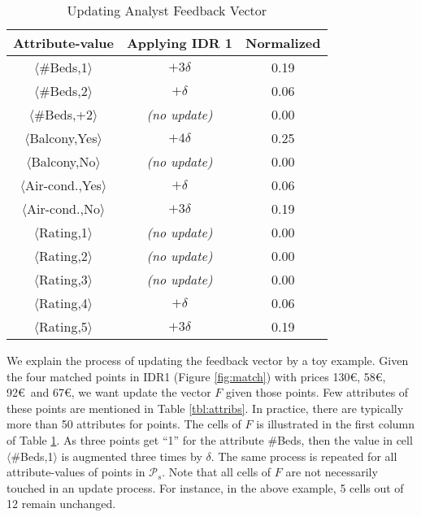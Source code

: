 \begin{table}[]
\centering
\caption{Updating Analyst Feedback Vector}
\label{tbl:feedback}
\begin{tabular}{|c|c|c|}
\hline
\textbf{Attribute-value}               & \textbf{Applying IDR 1} & \textbf{Normalized} \\ \hline
$\langle$\#Beds,1$\rangle$                   & $+3\delta$                       & 0.19                 \\ \hline
$\langle$\#Beds,2$\rangle$                 & $+\delta$                       & 0.06                 \\ \hline
$\langle$\#Beds,+2$\rangle$                  & {\em (no update)}                       & 0.00                    \\ \hline
$\langle$Balcony,Yes$\rangle$                   & $+4\delta$                      & 0.25                 \\ \hline
$\langle$Balcony,No$\rangle$                    & {\em (no update)}                        & 0.00                    \\ \hline
$\langle$Air-cond.,Yes$\rangle$               & $+\delta$                       & 0.06                 \\ \hline
$\langle$Air-cond.,No$\rangle$                & $+3\delta$                       & 0.19                 \\ \hline
$\langle$Rating,1$\rangle$                    & {\em (no update)}                       & 0.00                    \\ \hline
$\langle$Rating,2$\rangle$                     & {\em (no update)}                        & 0.00                    \\ \hline
$\langle$Rating,3$\rangle$                    & {\em (no update)}                        & 0.00                   \\ \hline
$\langle$Rating,4$\rangle$                   & $+\delta$                       & 0.06                 \\ \hline
$\langle$Rating,5$\rangle$                     & $+3\delta$                      & 0.19                 \\ \hline
\end{tabular}
\end{table}

\vspace{2pt}
We explain the process of updating the feedback vector by a toy example. Given the four matched points in IDR1 (Figure \ref{fig:match}) with prices 130\euro, 58\euro, 92\euro\ and 67\euro, we want update the vector $F$ given those points. Few attributes of these points are mentioned in Table \ref{tbl:attribs}. In practice, there are typically more than 50 attributes for points. The cells of $F$ is illustrated in the first column of Table \ref{tbl:feedback}. As three points get ``1'' for the attribute \#Beds, then the value in cell $\langle$\#Beds,1$\rangle$ is augmented three times by $\delta$. The same process is repeated for all attribute-values of points in $\mathcal{P}_s$. Note that all cells of $F$ are not necessarily touched in an update process. For instance, in the above example, 5 cells out of 12 remain unchanged.

